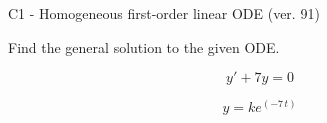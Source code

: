 \begin{exercise}
  \begin{exerciseTitle}C1 - Homogeneous first-order linear ODE (ver. 91)\end{exerciseTitle}
  \begin{exerciseStatement}
    
Find the general solution to the given ODE.

    
\[y'+7y=0\]

  \end{exerciseStatement}
  \begin{exerciseAnswer}
    
\[y= k e^{\left(-7 \, t\right)}\]

  \end{exerciseAnswer}
\end{exercise}